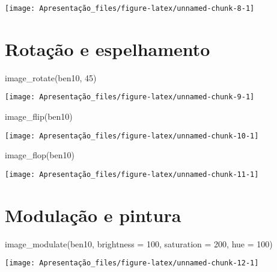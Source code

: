 \documentclass[
]{article}
\newenvironment{Shaded}{\begin{snugshade}}{\end{snugshade}}
\newcommand{\AttributeTok}[1]{\textcolor[rgb]{0.77,0.63,0.00}{#1}}
\newcommand{\DecValTok}[1]{\textcolor[rgb]{0.00,0.00,0.81}{#1}}
\newcommand{\FunctionTok}[1]{\textcolor[rgb]{0.00,0.00,0.00}{#1}}
\newcommand{\NormalTok}[1]{#1}
\begin{document}
\texttt{[image: Apresentação\_files/figure-latex/unnamed-chunk-8-1]}

\hypertarget{rotauxe7uxe3o-e-espelhamento}{%
\section{Rotação e espelhamento}\label{rotauxe7uxe3o-e-espelhamento}}

\begin{Shaded}
\begin{Highlighting}[]
\FunctionTok{image\_rotate}\NormalTok{(ben10, }\DecValTok{45}\NormalTok{)}
\end{Highlighting}
\end{Shaded}

\texttt{[image: Apresentação\_files/figure-latex/unnamed-chunk-9-1]}

\begin{Shaded}
\begin{Highlighting}[]
\FunctionTok{image\_flip}\NormalTok{(ben10)}
\end{Highlighting}
\end{Shaded}

\texttt{[image: Apresentação\_files/figure-latex/unnamed-chunk-10-1]}

\begin{Shaded}
\begin{Highlighting}[]
\FunctionTok{image\_flop}\NormalTok{(ben10)}
\end{Highlighting}
\end{Shaded}

\texttt{[image: Apresentação\_files/figure-latex/unnamed-chunk-11-1]}

\hypertarget{modulauxe7uxe3o-e-pintura}{%
\section{Modulação e pintura}\label{modulauxe7uxe3o-e-pintura}}

\begin{Shaded}
\begin{Highlighting}[]
\FunctionTok{image\_modulate}\NormalTok{(ben10, }\AttributeTok{brightness =} \DecValTok{100}\NormalTok{, }\AttributeTok{saturation =} \DecValTok{200}\NormalTok{, }\AttributeTok{hue =} \DecValTok{100}\NormalTok{)}
\end{Highlighting}
\end{Shaded}

\texttt{[image: Apresentação\_files/figure-latex/unnamed-chunk-12-1]}
\end{document}
